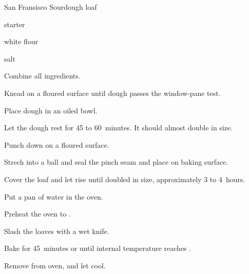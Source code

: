 \begin{recipe}{San Fransisco Sourdough}{}{\kgr{\half} loaf}

\begin{ingredients}
\item \C{1\threequarter} starter 
\item {} white flour 
\item {} salt
\end{ingredients}

\begin{directions}
\item Combine all ingredients.
\item Knead on a floured surface until dough passes the window-pane test.
\item Place dough in an oiled bowl.
\item Let the dough rest for 45 to 60~minutes. It should almost double in size.
\item Punch down on a floured surface.
\item Strech into a ball and seal the pinch seam and place on baking surface.
\item Cover the loaf and let rise until doubled in size, approximately 3 to 4~hours.
\item Put a pan of water in the oven.
\item Preheat the oven to .
\item Slash the loaves with a wet knife.
\item Bake for 45~minutes or until internal temperature reaches .
\item Remove from oven, and let cool.
\end{directions}
\end{recipe}
